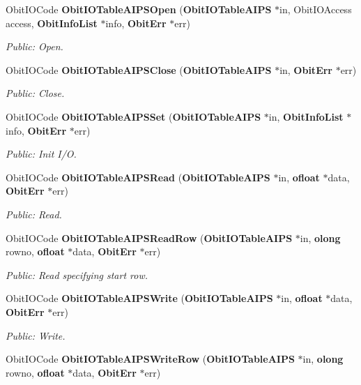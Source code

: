 \begin{CompactItemize}
Obit\-IOCode {\bf Obit\-IOTable\-AIPSOpen} ({\bf Obit\-IOTable\-AIPS} $\ast$in, Obit\-IOAccess access, {\bf Obit\-Info\-List} $\ast$info, {\bf Obit\-Err} $\ast$err)
\begin{CompactList}\small\item\em Public: Open. \item\end{CompactList}\item 
Obit\-IOCode {\bf Obit\-IOTable\-AIPSClose} ({\bf Obit\-IOTable\-AIPS} $\ast$in, {\bf Obit\-Err} $\ast$err)
\begin{CompactList}\small\item\em Public: Close. \item\end{CompactList}\item 
Obit\-IOCode {\bf Obit\-IOTable\-AIPSSet} ({\bf Obit\-IOTable\-AIPS} $\ast$in, {\bf Obit\-Info\-List} $\ast$info, {\bf Obit\-Err} $\ast$err)
\begin{CompactList}\small\item\em Public: Init I/O. \item\end{CompactList}\item 
Obit\-IOCode {\bf Obit\-IOTable\-AIPSRead} ({\bf Obit\-IOTable\-AIPS} $\ast$in, {\bf ofloat} $\ast$data, {\bf Obit\-Err} $\ast$err)
\begin{CompactList}\small\item\em Public: Read. \item\end{CompactList}\item 
Obit\-IOCode {\bf Obit\-IOTable\-AIPSRead\-Row} ({\bf Obit\-IOTable\-AIPS} $\ast$in, {\bf olong} rowno, {\bf ofloat} $\ast$data, {\bf Obit\-Err} $\ast$err)
\begin{CompactList}\small\item\em Public: Read specifying start row. \item\end{CompactList}\item 
Obit\-IOCode {\bf Obit\-IOTable\-AIPSWrite} ({\bf Obit\-IOTable\-AIPS} $\ast$in, {\bf ofloat} $\ast$data, {\bf Obit\-Err} $\ast$err)
\begin{CompactList}\small\item\em Public: Write. \item\end{CompactList}\item 
Obit\-IOCode {\bf Obit\-IOTable\-AIPSWrite\-Row} ({\bf Obit\-IOTable\-AIPS} $\ast$in, {\bf olong} rowno, {\bf ofloat} $\ast$data, {\bf Obit\-Err} $\ast$err)

\end{CompactItemize}
